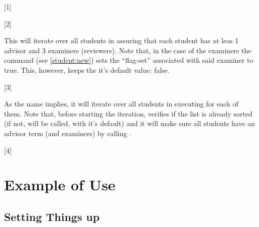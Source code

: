 \documentclass[10pt]{article}
\begin{document}
[1]

[2]

\begin{codedescribe}{\listemptytermsifnone}
\begin{codesyntax}
\end{codesyntax}
This will iterate over all students in  assuring that each student has at leas 1 advisor and 3 examiners (reviewers). Note that, in the case of the examiners the \tsobj{\examiner} command (see \ref{student:new}) sets the ``flag-set'' associated with said examiner to true. This, however, keeps the it's default value: false.
\end{codedescribe}

[3]


\begin{codedescribe}{\studentlistiterate}
\begin{codesyntax}
\end{codesyntax}
As the name implies, it will iterate over all students in  executing  for each of them. Note that, before starting the iteration, \tsobj{\studentlistiterate} verifies if the list is already sorted (if not, \tsobj{\studentlistsort} will be called, with it's default) and it will make sure all students have an advisor term (and examiners) by calling \tsobj{\listemptytermsifnone}.
\end{codedescribe}

[4]

\newpage
\section{Example of Use}
\subsection{Setting Things up}

\begin{codestore}

  
\end{codestore}
\end{document}
